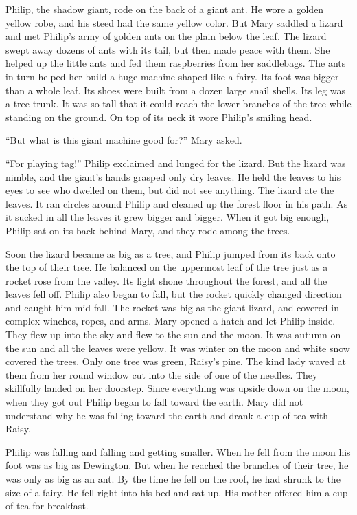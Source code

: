 \documentclass[10pt]{memoir}
\begin{document}
Philip, the shadow giant, rode on the back of a giant ant. He wore a golden
yellow robe, and his steed had the same yellow color. But Mary saddled a lizard
and met Philip's army of golden ants on the plain below the leaf. The lizard
swept away dozens of ants with its tail, but then made peace with them. She
helped up the little ants and fed them raspberries from her saddlebags. The
ants in turn helped her build a huge machine shaped like a fairy. Its foot was
bigger than a whole leaf. Its shoes were built from a dozen large snail shells.
Its leg was a tree trunk. It was so tall that it could reach the lower branches
of the tree while standing on the ground. On top of its neck it wore Philip's
smiling head.

``But what is this giant machine good for?'' Mary asked.

``For playing tag!'' Philip exclaimed and lunged for the lizard. But the lizard
was nimble, and the giant's hands grasped only dry leaves. He held the leaves to
his eyes to see who dwelled on them, but did not see anything. The lizard ate
the leaves. It ran circles around Philip and cleaned up the forest floor in his
path. As it sucked in all the leaves it grew bigger and bigger. When it got big
enough, Philip sat on its back behind Mary, and they rode among the trees.

Soon the lizard became as big as a tree, and Philip jumped from its back onto
the top of their tree. He balanced on the uppermost leaf of the tree just as a
rocket rose from the valley. Its light shone throughout the forest, and all the
leaves fell off. Philip also began to fall, but the rocket quickly changed
direction and caught him mid-fall. The rocket was big as the giant lizard, and
covered in complex winches, ropes, and arms. Mary opened a hatch and let
Philip inside. They flew up into the sky and flew to the sun and the moon. It
was autumn on the sun and all the leaves were yellow. It was winter on the moon
and white snow covered the trees. Only one tree was green, Raisy's pine. The
kind lady waved at them from her round window cut into the side of one of the
needles. They skillfully landed on her doorstep. Since everything was upside
down on the moon, when they got out Philip began to fall toward the earth. Mary
did not understand why he was falling toward the earth and drank a cup of tea
with Raisy.

Philip was falling and falling and getting smaller. When he fell from the moon
his foot was as big as Dewington. But when he reached the branches of their
tree, he was only as big as an ant. By the time he fell on the roof, he had
shrunk to the size of a fairy. He fell right into his bed and sat up. His
mother offered him a cup of tea for breakfast.
\end{document}
